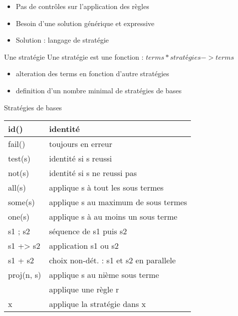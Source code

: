 
\begin{frame}{}
\begin{itemize}
\item Pas de contrôles sur l'application des règles
\item Besoin d'une solution générique et expressive
\pause
\item \vspace{0.4cm} Solution : langage de stratégie
\end{itemize}
\end{frame}

\begin{frame}{Une stratégie}
Une stratégie est une fonction : $ terms * stratégies -> terms $

\begin{itemize}
\item alteration des terms en fonction d'autre stratégies
\item definition d'un nombre minimal de stratégies de bases
\end{itemize}
\end{frame}

\begin{frame}[fragile]{Stratégies de bases}

{\fontsize{7}{7}

\begin{center}
    \begin{tabular}{ | l | p{6cm}|}
    \hline
    id() & identité \\ \hline
    fail() & toujours en erreur \\ \hline
    test(s) & identité si s reussi \\ \hline
    not(s) & identité si s ne reussi pas \\ \hline
    all(s) & applique s à tout les sous termes \\ \hline
    some(s) & applique s au maximum de sous termes \\ \hline
    one(s) & applique s à au moins un sous terme  \\ \hline
    s1 ; s2 & séquence de s1 puis s2 \\ \hline
    s1 +> s2 & application s1 ou s2 \\ \hline
    s1 + s2 & choix non-dét. : s1 et s2 en parallele \\ \hline 
    proj(n, s) & applique s au nième sous terme \\ \hline
    [r] & applique une règle r \\ \hline
    x & applique la stratégie dans x \\ \hline
    \end{tabular}
\end{center}
}
\end{frame}

